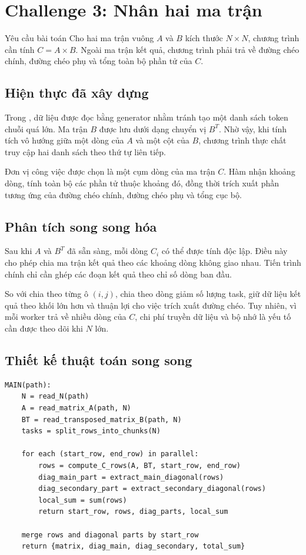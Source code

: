 \section{Challenge 3: Nhân hai ma trận}
\label{sec:challenge3}

\begin{requirementbox}{Yêu cầu bài toán}
Cho hai ma trận vuông $A$ và $B$ kích thước $N \times N$, chương trình cần tính $C = A \times B$. Ngoài ma trận kết quả, chương trình phải trả về đường chéo chính, đường chéo phụ và tổng toàn bộ phần tử của $C$.
\end{requirementbox}

\subsection{Hiện thực đã xây dựng}
Trong , dữ liệu được đọc bằng generator  nhằm tránh tạo một danh sách token chuỗi quá lớn. Ma trận $B$ được lưu dưới dạng chuyển vị $B^T$. Nhờ vậy, khi tính tích vô hướng giữa một dòng của $A$ và một cột của $B$, chương trình thực chất truy cập hai danh sách theo thứ tự liên tiếp.

Đơn vị công việc được chọn là một cụm dòng của ma trận $C$. Hàm  nhận khoảng dòng, tính toàn bộ các phần tử thuộc khoảng đó, đồng thời trích xuất phần tương ứng của đường chéo chính, đường chéo phụ và tổng cục bộ.

\subsection{Phân tích song song hóa}
Sau khi $A$ và $B^T$ đã sẵn sàng, mỗi dòng $C_i$ có thể được tính độc lập. Điều này cho phép chia ma trận kết quả theo các khoảng dòng không giao nhau. Tiến trình chính chỉ cần ghép các đoạn kết quả theo chỉ số dòng ban đầu.

So với chia theo từng ô $(i,j)$, chia theo dòng giảm số lượng task, giữ dữ liệu kết quả theo khối lớn hơn và thuận lợi cho việc trích xuất đường chéo. Tuy nhiên, vì mỗi worker trả về nhiều dòng của $C$, chi phí truyền dữ liệu và bộ nhớ là yếu tố cần được theo dõi khi $N$ lớn.

\subsection{Thiết kế thuật toán song song}
\begin{lstlisting}[caption={Pseudocode song song cho Challenge 3}]
MAIN(path):
    N = read_N(path)
    A = read_matrix_A(path, N)
    BT = read_transposed_matrix_B(path, N)
    tasks = split_rows_into_chunks(N)

    for each (start_row, end_row) in parallel:
        rows = compute_C_rows(A, BT, start_row, end_row)
        diag_main_part = extract_main_diagonal(rows)
        diag_secondary_part = extract_secondary_diagonal(rows)
        local_sum = sum(rows)
        return start_row, rows, diag_parts, local_sum

    merge rows and diagonal parts by start_row
    return {matrix, diag_main, diag_secondary, total_sum}
\end{lstlisting}

